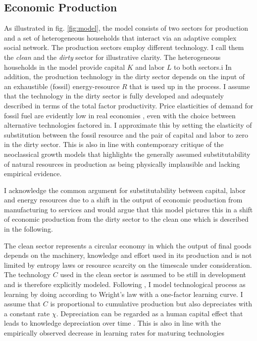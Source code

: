 \subsection{Economic Production}
\label{sec:model_description}

As illustrated in fig. \ref{fig:model}, the model consists of two sectors for production and a set of heterogeneous households that interact via an adaptive complex social network. The production sectors employ different technology. I call them the \textit{clean} and the \textit{dirty} sector for illustrative clarity. The heterogeneous households in the model provide capital $K$ and labor $L$ to both sectors.i
In addition, the production technology in the dirty sector depends on the input of an exhaustible (fossil) energy-resource $R$ that is used up in the process. I assume that the technology in the dirty sector is fully developed and adequately described in terms of the total factor productivity. 
Price elasticities of demand for fossil fuel are evidently low in real economies \cite{IMF2011, Hosslinger2017, Labandeira2017}, even with the choice between alternative technologies factored in. I approximate this by setting the elasticity of substitution between the fossil resource and the pair of capital and labor to zero in the dirty sector. This is also in line with contemporary critique of the neoclassical growth models \cite{Daly1997,georgescu1975energy,georgescu1979comments, Ayres2007, Ayres2013} that highlights the generally assumed substitutability of natural resources in production as being physically implausible and lacking empirical evidence.

I acknowledge the common argument for substitutability between capital, labor and energy resources due to a shift in the output of economic production from manufacturing to services and would argue that this model pictures this in a shift of economic production from the dirty sector to the clean one which is described in the following.

The clean sector represents a circular economy in which the output of final goods depends on the machinery, knowledge and effort used in its production and is not limited by entropy laws or resource scarcity on the timescale under consideration. The technology $C$ used in the clean sector is assumed to be still in development and is therefore explicitly modeled.
Following \cite{argote1990learning}, I model technological process as learning by doing according to Wright's law \cite{wright1936factors, Nagy2013} with a one-factor learning curve. I assume that $C$ is proportional to cumulative production but also depreciates with a constant rate $\chi$. Depreciation can be regarded as a human capital effect that leads to knowledge depreciation over time \cite{Kahouli-Brahmi2008}. This is also in line with the empirically observed decrease in learning rates for maturing technologies \cite{argote1990learning}

